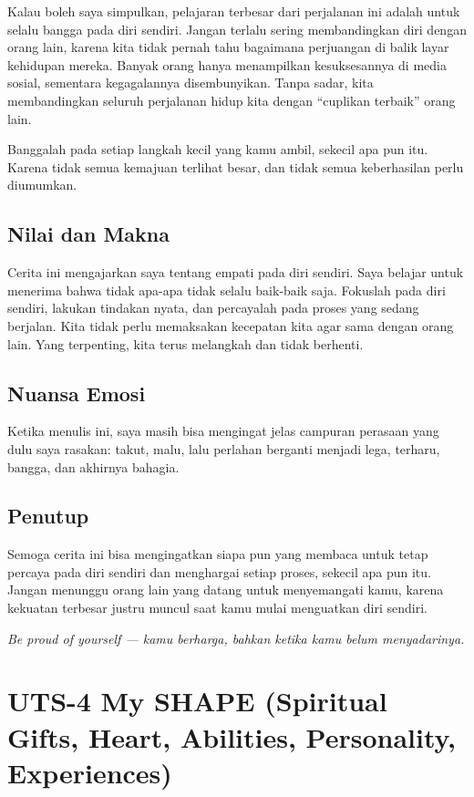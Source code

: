 \documentclass[
  letterpaper,
  DIV=11,
  numbers=noendperiod]{scrreprt}
\begin{document}
Kalau boleh saya simpulkan, pelajaran terbesar dari perjalanan ini
adalah untuk selalu bangga pada diri sendiri. Jangan terlalu sering
membandingkan diri dengan orang lain, karena kita tidak pernah tahu
bagaimana perjuangan di balik layar kehidupan mereka. Banyak orang hanya
menampilkan kesuksesannya di media sosial, sementara kegagalannya
disembunyikan. Tanpa sadar, kita membandingkan seluruh perjalanan hidup
kita dengan ``cuplikan terbaik'' orang lain.

Banggalah pada setiap langkah kecil yang kamu ambil, sekecil apa pun
itu. Karena tidak semua kemajuan terlihat besar, dan tidak semua
keberhasilan perlu diumumkan.

\section{Nilai dan Makna}\label{nilai-dan-makna}

Cerita ini mengajarkan saya tentang empati pada diri sendiri. Saya
belajar untuk menerima bahwa tidak apa-apa tidak selalu baik-baik saja.
Fokuslah pada diri sendiri, lakukan tindakan nyata, dan percayalah pada
proses yang sedang berjalan. Kita tidak perlu memaksakan kecepatan kita
agar sama dengan orang lain. Yang terpenting, kita terus melangkah dan
tidak berhenti.

\section{Nuansa Emosi}\label{nuansa-emosi}

Ketika menulis ini, saya masih bisa mengingat jelas campuran perasaan
yang dulu saya rasakan: takut, malu, lalu perlahan berganti menjadi
lega, terharu, bangga, dan akhirnya bahagia.

\section{Penutup}\label{penutup-1}

Semoga cerita ini bisa mengingatkan siapa pun yang membaca untuk tetap
percaya pada diri sendiri dan menghargai setiap proses, sekecil apa pun
itu. Jangan menunggu orang lain yang datang untuk menyemangati kamu,
karena kekuatan terbesar justru muncul saat kamu mulai menguatkan diri
sendiri.

\emph{Be proud of yourself --- kamu berharga, bahkan ketika kamu belum
menyadarinya.}


\chapter{UTS-4 My SHAPE (Spiritual Gifts, Heart, Abilities, Personality,
Experiences)}\label{uts-4-my-shape-spiritual-gifts-heart-abilities-personality-experiences}
\end{document}
